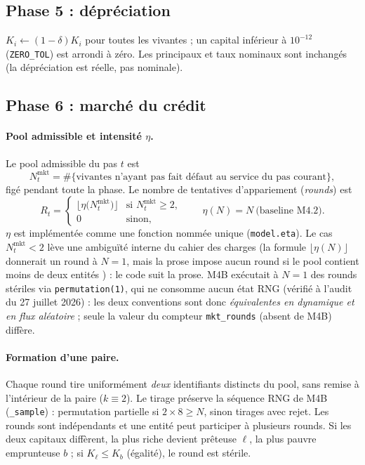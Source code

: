 \documentclass[11pt,a4paper]{article}
\newcommand{\code}[1]{\texttt{#1}}
\begin{document}
\subsection{Phase 5 : dépréciation}

$K_i \leftarrow (1-\delta)K_i$ pour toutes les vivantes ; un capital
inférieur à $10^{-12}$ (\code{ZERO\_TOL}) est arrondi à zéro. Les principaux
et taux nominaux sont inchangés (la dépréciation est réelle, pas nominale).

\subsection{Phase 6 : marché du crédit}
\label{sec:market}

\paragraph{Pool admissible et intensité $\eta$.}
Le pool admissible du pas $t$ est
\begin{equation}
N^{\mathrm{mkt}}_t=\#\{\text{vivantes n'ayant pas fait défaut au service
du pas courant}\},
\end{equation}
figé pendant toute la phase. Le nombre de tentatives d'appariement
(\emph{rounds}) est
\begin{equation}
R_t=
\begin{cases}
\bigl\lfloor \eta\bigl(N^{\mathrm{mkt}}_t\bigr)\bigr\rfloor
& \text{si } N^{\mathrm{mkt}}_t\ge2,\\[2pt]
0 & \text{sinon,}
\end{cases}
\qquad\boxed{\eta(N)=N}\ \text{(baseline M4.2)} .
\end{equation}
$\eta$ est implémentée comme une fonction nommée unique
(\code{model.eta}). Le cas $N^{\mathrm{mkt}}_t<2$ lève une ambiguïté
interne du cahier des charges (la formule $\lfloor\eta(N)\rfloor$
donnerait un round à $N=1$, mais la prose impose \og aucun round si le
pool contient moins de deux entités \fg) : le code suit la prose. M4B
exécutait à $N=1$ des rounds stériles via \code{permutation(1)}, qui ne
consomme aucun état RNG (vérifié à l'audit du 27 juillet 2026) : les deux
conventions sont donc \emph{équivalentes en dynamique et en flux
aléatoire} ; seule la valeur du compteur \code{mkt\_rounds} (absent de
M4B) diffère.

\paragraph{Formation d'une paire.}
Chaque round tire uniformément \emph{deux} identifiants distincts du pool,
sans remise à l'intérieur de la paire ($k\equiv2$). Le tirage préserve la
séquence RNG de M4B (\code{\_sample}) : permutation partielle si
$2\times8\ge N$, sinon tirages avec rejet. Les rounds sont indépendants et
une entité peut participer à plusieurs rounds. Si les deux capitaux
diffèrent, la plus riche devient prêteuse $\ell$, la plus pauvre
emprunteuse $b$ ; si $K_\ell\le K_b$ (égalité), le round est stérile.
\end{document}
